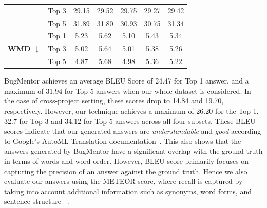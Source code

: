 \begin{table}[!ht]
{\begin{tabular}{|ccccccc|}
\multicolumn{1}{|c|}{} & \multicolumn{1}{c|}{Top 3} & \multicolumn{1}{c|}{29.15} & \multicolumn{1}{c|}{29.52} & \multicolumn{1}{c|}{29.75} & \multicolumn{1}{c|}{29.27} & 29.42 \\ \cline{2-7} 
\multicolumn{1}{|c|}{} & \multicolumn{1}{c|}{Top 5} & \multicolumn{1}{c|}{31.89} & \multicolumn{1}{c|}{31.80} & \multicolumn{1}{c|}{30.93} & \multicolumn{1}{c|}{30.75} & 31.34 \\ \hline
\multicolumn{1}{|c|}{\multirow{3}{*}{\textbf{WMD $\downarrow$}}} & \multicolumn{1}{c|}{Top 1} & \multicolumn{1}{c|}{5.23} & \multicolumn{1}{c|}{5.62} & \multicolumn{1}{c|}{5.10} & \multicolumn{1}{c|}{5.43} & 5.34 \\ \cline{2-7} 
\multicolumn{1}{|c|}{} & \multicolumn{1}{c|}{Top 3} & \multicolumn{1}{c|}{5.02} & \multicolumn{1}{c|}{5.64} & \multicolumn{1}{c|}{5.01} & \multicolumn{1}{c|}{5.38} & 5.26 \\ \cline{2-7} 
\multicolumn{1}{|c|}{} & \multicolumn{1}{c|}{Top 5} & \multicolumn{1}{c|}{4.87} & \multicolumn{1}{c|}{5.68} & \multicolumn{1}{c|}{4.98} & \multicolumn{1}{c|}{5.36} & 5.22 \\ \hline
\end{tabular}%
}
\end{table}

BugMentor achieves an average BLEU Score of 24.47 for Top 1 answer, and a maximum of 31.94 for Top 5 answers when our whole dataset is considered. In the case of cross-project setting, these scores drop to 14.84 and 19.70, respectively. However, our technique achieves a maximum of 26.20 for the Top 1, 32.7 for Top 3 and 34.12 for Top 5 answers across all four subsets. These BLEU scores indicate that our generated answers are \textit{understandable} and \textit{good} according to Google’s AutoML Translation documentation~\cite{automldoc}. This also shows that the answers generated by BugMentor have a significant overlap with the ground truth in terms of words and word order. However, BLEU score primarily focuses on capturing the precision of an answer against the ground truth. Hence we also evaluate our answers using the METEOR score, where recall is captured by taking into account additional information such as synonyms, word forms, and sentence structure ~\cite{banerjee2005meteor}.\par


